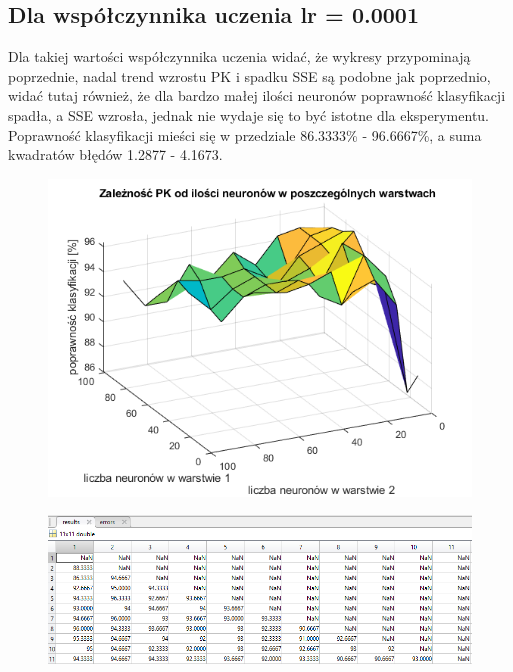 \documentclass[a4paper, 12pt]{report}
\begin{document}
\subsection{Dla współczynnika uczenia lr = 0.0001}
Dla takiej wartości współczynnika uczenia widać, że wykresy przypominają poprzednie, nadal trend wzrostu PK i spadku SSE są podobne jak poprzednio, widać tutaj również, że dla bardzo małej ilości neuronów poprawność klasyfikacji spadła, a SSE wzrosła, jednak nie wydaje się to być istotne dla eksperymentu. Poprawność klasyfikacji mieści się w przedziale 86.3333\% - 96.6667\%, a suma kwadratów błędów 1.2877 - 4.1673.
\begin{figure}[hbt!]
\includegraphics[width=14cm]{lr4 pk}
\centering
\end{figure}
\begin{figure}[hbt!]

\includegraphics[width=14cm]{lr4 pk dane}
\centering
\end{figure}
\end{document}
